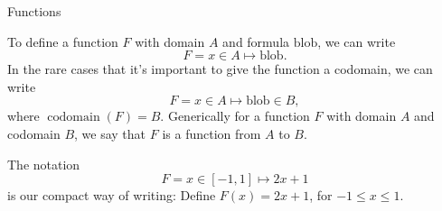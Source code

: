 \documentclass[fleqn]{beamer}
\DeclareMathOperator{\codomain}{codomain}
\theoremstyle{definition}
\newtheorem{myfact}{Fact}
\begin{document}
\begin{comment}

\begin{frame}{Vacuous Truth}  Let \(T\) be a boolean valued function. Consider the statement
\[
   (\exists x \in \varnothing)(T(x)).
\]
To show that it's true, you would have to find a member of the empty set that makes \(T\) true. There are no members of the empty set, so for any predicate \(T\), we have
\[
     (\exists x \in \varnothing)(T(x)) \equiv \mbox{false}.
\]
Thus it's negation is true; that is
\[
    (\exists x \in \varnothing)(\lnot T(x)) \equiv \mbox{true}.
\]
\begin{myfact} For any boolean valued function \(T\), we have
 \begin{align*}
  (\exists x \in \varnothing)(T(x)) \equiv \mbox{false}, \\
   (\forall x \in \varnothing)(T(x)) \equiv \mbox{true}.
    \end{align*}
\end{myfact}

\end{frame}
\end{comment}

\begin{frame}{Functions}

To define a function \(F\) with domain \(A\) and formula \(\mbox{blob}\), we can write
\[
  F = x \in A \mapsto \mbox{blob}.
\]
In the rare cases that it's important to give the function a codomain, we can write
\[
  F = x \in A \mapsto \mbox{blob} \in B,
\]
where \(\codomain(F) = B\). Generically for a function \(F\) with domain \(A\) and codomain \(B\),  we say that \(F\) is a function from \(A\) to \(B\).

\begin{example} The notation
\[
   F = x \in [-1,1] \mapsto 2 x + 1
\]
is our compact way of writing: Define \(F(x) = 2x + 1 \), for \( -1 \leq x \leq 1\).
\end{example}
\end{frame}
\end{document}
